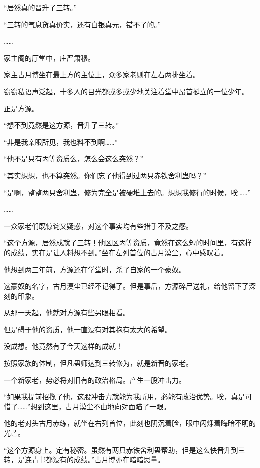 
\begin{this_body}



“居然真的晋升了三转。”

“三转的气息货真价实，还有白银真元，错不了的。”

……

家主阁的厅堂中，庄严肃穆。

家主古月博坐在最上方的主位上，众多家老则在左右两排坐着。

窃窃私语声泛起，十多人的目光都或多或少地关注着堂中昂首挺立的一位少年。

正是方源。

“想不到竟然是这方源，晋升了三转。”

“非是我亲眼所见，我也料不到啊……”

“他不是只有丙等资质么，怎么会这么突然？”

“其实想想，也不算突然。你们忘了他得到过两只赤铁舍利蛊吗？”

“是啊，整整两只舍利蛊，修为完全是被硬堆上去的。想想我修行的时候，唉……”

……

一众家老们既惊诧又疑惑，对这个事实均有些措手不及之感。

“这个方源，居然成就了三转！他区区丙等资质，竟然在这么短的时间里，有这样的成绩，实在是让人料想不到。”坐在左列首位的古月漠尘，心中感叹着。

他想到两三年前，方源还在学堂时，杀了自家的一个豪奴。

这豪奴的名字，古月漠尘已经不记得了。但是事后，方源碎尸送礼，给他留下了深刻的印象。

从那一天起，他就对方源有些另眼相看。

但是碍于他的资质，他一直没有对其抱有太大的希望。

没成想。他竟然有了今天这样的成就！

按照家族的体制，但凡蛊师达到三转修为，就是新晋的家老。

一个新家老，势必将对旧有的政治格局。产生一股冲击力。

“如果我提前招揽了他，这股冲击力就能为我所用，必能有政治优势。唉，真是可惜了……”想到这里，古月漠尘不由地向对面瞄了一眼。

他的老对头古月赤练，就坐在右列首位，此刻也阴沉着脸，眼中闪烁着晦暗不明的光芒。

“这个方源身上。定有秘密。虽然有两只赤铁舍利蛊帮助，但是这么快晋升到三转，是连青书都没有的成绩。”古月博亦在暗暗思量。


\end{this_body}
